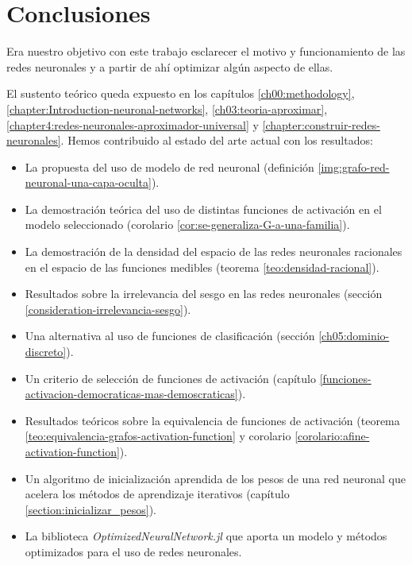 
\chapter{Conclusiones} 
\label{ch09:conclusion}
Era nuestro objetivo con este trabajo esclarecer 
el motivo y funcionamiento de las redes neuronales y 
a partir de ahí optimizar algún aspecto de ellas. 

El sustento teórico queda expuesto en los capítulos 
\ref{ch00:methodology}, \ref{chapter:Introduction-neuronal-networks},
\ref{ch03:teoria-aproximar}, \ref{chapter4:redes-neuronales-aproximador-universal}
y \ref{chapter:construir-redes-neuronales}. 
Hemos contribuido al estado del arte actual con los 
resultados: 

\begin{itemize}
    \item La propuesta del uso de modelo de red neuronal (definición \ref{img:grafo-red-neuronal-una-capa-oculta}).
    \item La demostración teórica del uso de distintas funciones de activación en 
    el modelo seleccionado (corolario \ref{cor:se-generaliza-G-a-una-familia}). 
    \item La demostración de la densidad del espacio de las redes neuronales racionales en el espacio de las funciones medibles (teorema \ref{teo:densidad-racional}).
    \item Resultados sobre la irrelevancia del sesgo en las redes neuronales (sección \ref{consideration-irrelevancia-sesgo}).
    \item Una alternativa al uso de funciones de clasificación (sección \ref{ch05:dominio-discreto}).
    \item Un criterio de selección de funciones de activación (capítulo \ref{funciones-activacion-democraticas-mas-demoscraticas}).
    \item Resultados teóricos sobre la equivalencia de funciones de activación (teorema \ref{teo:equivalencia-grafos-activation-function} y 
    corolario \ref{corolario:afine-activation-function}).
    \item Un algoritmo de inicialización aprendida de los pesos de una red neuronal que acelera los métodos de aprendizaje iterativos (capítulo \ref{section:inicializar_pesos}).
    \item La biblioteca \textit{OptimizedNeuralNetwork.jl} que aporta un modelo y métodos optimizados para el uso de redes neuronales. 
\end{itemize}

